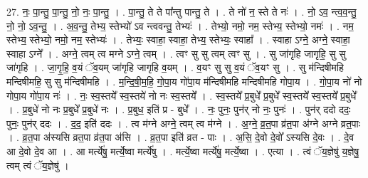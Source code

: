 \documentclass[17pt]{extarticle}
\begin{document}
27. नः॒ पा॒न्तु॒ पा॒न्तु॒ नो॒ नः॒ पा॒न्तु॒ । . पा॒न्तु॒ ते ते पा᳚न्तु पान्तु॒ ते । . ते नो॑ न॒ स्ते ते नः॑ । . नो॒ ऽव॒ न्त्व॒व॒न्तु॒ नो॒ नो॒ ऽव॒न्तु॒ । . अ॒व॒न्तु॒ तेभ्य॒ स्तेभ्यो॑ ऽव न्त्ववन्तु॒ तेभ्यः॑ । . तेभ्यो॒ नमो॒ नम॒ स्तेभ्य॒ स्तेभ्यो॒ नमः॑ । . नम॒ स्तेभ्य॒ स्तेभ्यो॒ नमो॒ नम॒ स्तेभ्यः॑ । . तेभ्यः॒ स्वाहा॒ स्वाहा॒ तेभ्य॒ स्तेभ्यः॒ स्वाहा᳚ । . स्वाहा ऽग्ने॒ अग्ने॒ स्वाहा॒ स्वाहा ऽग्ने᳚ । . अग्ने॒ त्वम् त्व मग्ने ऽग्ने॒ त्वम् । . त्वꣳ सु सु त्वम् त्वꣳ सु । . सु जा॑गृहि जागृहि॒ सु सु जा॑गृहि । . जा॒गृ॒हि॒ व॒यं ॅव॒यम् जा॑गृहि जागृहि व॒यम् । . व॒यꣳ सु सु व॒यं ॅव॒यꣳ सु । . सु म॑न्दिषीमहि मन्दिषीमहि॒ सु सु म॑न्दिषीमहि । . म॒न्दि॒षी॒म॒हि॒ गो॒पा॒य गो॑पा॒य म॑न्दिषीमहि मन्दिषीमहि गोपा॒य । . गो॒पा॒य नो॑ नो गोपा॒य गो॑पा॒य नः॑ । . नः॒ स्व॒स्तये᳚ स्व॒स्तये॑ नो नः स्व॒स्तये᳚ । . स्व॒स्तये᳚ प्र॒बुधे᳚ प्र॒बुधे᳚ स्व॒स्तये᳚ स्व॒स्तये᳚ प्र॒बुधे᳚ । . प्र॒बुधे॑ नो नः प्र॒बुधे᳚ प्र॒बुधे॑ नः । . प्र॒बुध॒ इति॑ प्र - बुधे᳚ । . नः॒ पुनः॒ पुन॑र् नो नः॒ पुनः॑ । . पुन॑र् ददो ददः॒ पुनः॒ पुन॑र् ददः । . द॒द॒ इति॑ ददः । . त्व म॑ग्ने अग्ने॒ त्वम् त्व म॑ग्ने । . अ॒ग्ने॒ व्र॒त॒पा व्र॑त॒पा अ॑ग्ने अग्ने व्रत॒पाः । . व्र॒त॒पा अ॑स्यसि व्रत॒पा व्र॑त॒पा अ॑सि । . व्र॒त॒पा इति॑ व्रत - पाः । . अ॒सि॒ दे॒वो दे॒वो᳚ ऽस्यसि दे॒वः । . दे॒व आ दे॒वो दे॒व आ । . आ मर्त्ये॑षु॒ मर्त्ये॒ष्वा मर्त्ये॑षु । . मर्त्ये॒ष्वा मर्त्ये॑षु॒ मर्त्ये॒ष्वा । . एत्या । . त्वं ॅय॒ज्ञेषु॑ य॒ज्ञेषु॒ त्वम् त्वं ॅय॒ज्ञेषु॑ । \newline
\end{document}
